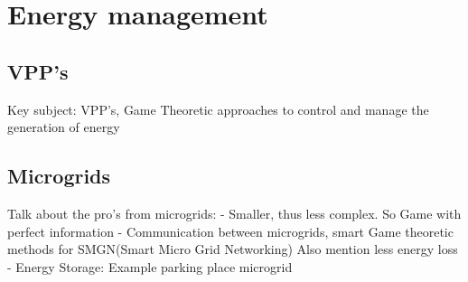 \section{Energy management}


\subsection{VPP's}
Key subject: VPP's, Game Theoretic approaches to control and manage the generation of energy


\subsection{Microgrids}
Talk about the pro's from microgrids:
 - Smaller, thus less complex. So Game with perfect information
 - Communication between microgrids, smart Game theoretic methods for SMGN(Smart Micro Grid Networking) Also mention less energy loss
 - Energy Storage: Example parking place microgrid






